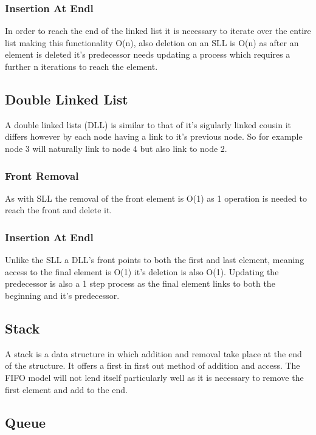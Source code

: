 \documentclass[pdftex,a4paper,10pt,titlepage]{article}
\begin{document}
\subsubsection{Insertion At Endl}
In order to reach the end of the linked list it is necessary to iterate over the entire list making this functionality  O(n), also deletion on an SLL is O(n) as after an element is deleted it’s predecessor needs updating a process which requires a further n iterations to reach the element.

\subsection{Double Linked List}

A double linked lists (DLL) is similar to that of it’s sigularly linked cousin it differs however by each node having a link to it’s previous node. So for example node 3 will naturally link to node 4 but also link to node 2.

\subsubsection{Front Removal}
As with SLL the removal of the front element is  O(1) as 1 operation is needed to reach the front and delete it.

\subsubsection{Insertion At Endl}
Unlike the SLL a DLL’s front points to both the first and last element, meaning access to the final element is O(1) it’s deletion is also O(1). Updating the predecessor is also a 1 step process as the final element links to both the beginning and it’s predecessor.

\subsection{Stack}

A stack is a data structure in which addition and removal take place at the end of the structure. It offers a first in first out method of addition and access. The FIFO model will not lend itself particularly well as it is necessary to remove the first element and add to the end.

\subsection{Queue}
\end{document}
